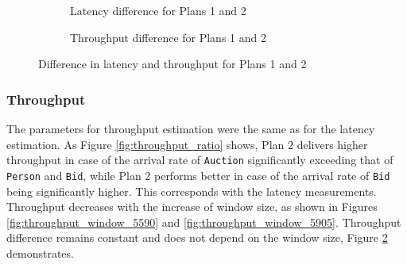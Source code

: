 \begin{figure}[!ht]
    \centering
    \begin{subfigure}[b]{0.45\textwidth}
            
            \captionsetup{justification=justified}
            \caption{Latency difference for Plans 1 and 2}
            \label{fig:latency_diff_against_window_size}
    \end{subfigure}
    \hspace{1.25mm}
    \begin{subfigure}[b]{0.45\textwidth}
        
        \captionsetup{justification=justified}
        \caption{Throughput difference for Plans 1 and 2}
        \label{fig:throughput_diff_against_window_size}
    \end{subfigure}
    \caption{Difference in latency and throughput for Plans 1 and 2}
    \label{fig:latency_and_throughput_difference}
\end{figure}

\subsubsection{Throughput}

The parameters for throughput estimation were the same as for the latency estimation. As Figure \ref{fig:throughput_ratio} shows, Plan 2 delivers higher throughput in case of the arrival rate of \texttt{Auction} significantly exceeding that of \texttt{Person} and \texttt{Bid}, while Plan 2 performs better in case of the arrival rate of \texttt{Bid} being significantly higher. This corresponds with the latency measurements. Throughput decreases with the increase of window size, as shown in Figures \ref{fig:throughput_window_5590} and \ref{fig:throughput_window_5905}. Throughput difference remains constant and does not depend on the window size, Figure \ref{fig:throughput_diff_against_window_size} demonstrates.

